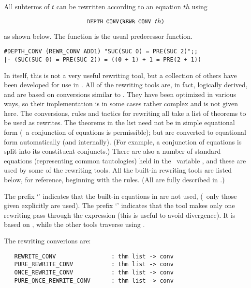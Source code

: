\noindent All subterms of $t$ can be rewritten according to
an equation $th$ using

\[ \ml{DEPTH\_CONV(REWR\_CONV}\;\;th\ml{)}  \]

\noindent as shown below. The function  is the usual
predecessor function.

\begin{session}\begin{verbatim}
#DEPTH_CONV (REWR_CONV ADD1) "SUC(SUC 0) = PRE(SUC 2)";;
|- (SUC(SUC 0) = PRE(SUC 2)) = ((0 + 1) + 1 = PRE(2 + 1))
\end{verbatim}\end{session}

In itself, this is not a very useful rewriting tool, but a collection
of others have been developed for use in \HOL.
All of the rewriting tools are, in fact, logically derived, and are
based on conversions similar to .
They have been optimized in various ways, so their
implementation is in some cases rather complex and is not given here.
The conversions, rules and tactics for rewriting all take a list of
theorems
to be used as rewrites.
The theorems in the list need not be in simple equational form
(\eg\ a conjunction of equations is permissible); but are
converted to equational form
automatically (and internally).
(For example, a conjunction of equations is split into
its constituent conjuncts.)  There are also a number
of standard equations (representing common tautologies) held in
the \ML\ variable
, and these
are used by some of the rewriting tools. All the
built-in rewriting tools are listed below, for
reference, beginning with the rules.
(All are fully
described in \REFERENCE.)

The prefix `' indicates
that the built-in equations in  are not used,
(\ie\ only those
given explicitly are used).  The prefix `' indicates that the
tool
makes only one rewriting pass through the expression
(this is useful to avoid divergence). It is based on ,
while the other tools traverse using .

The rewriting converions are:

\begin{hol}\begin{verbatim}
   REWRITE_CONV                : thm list -> conv
   PURE_REWRITE_CONV           : thm list -> conv
   ONCE_REWRITE_CONV           : thm list -> conv
   PURE_ONCE_REWRITE_CONV      : thm list -> conv
\end{verbatim}\end{hol}


